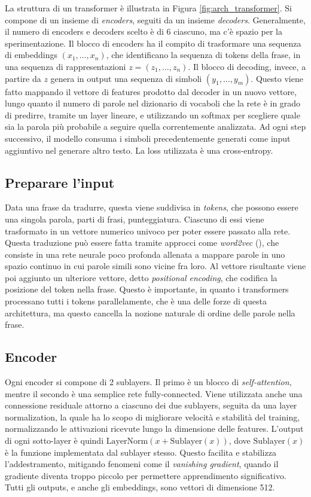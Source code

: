 La struttura di un transformer è illustrata in Figura \ref{fig:arch_transformer}. Si compone di un insieme di \textit{encoders}, seguiti da un insieme \textit{decoders}. Generalmente, il numero di encoders e decoders scelto è di 6 ciascuno, ma c'è spazio per la sperimentazione. Il blocco di encoders ha il compito di trasformare una sequenza di embeddings \((x_1, \dots, x_n)\), che identificano la sequenza di tokens della frase, in una sequenza di rappresentazioni \(z = (z_1, \dots, z_n)\). Il blocco di decoding, invece, a partire da \(z\) genera in output una sequenza di simboli \((y_1, \dots, y_m)\). Questo viene fatto mappando il vettore di features prodotto dal decoder in un nuovo vettore, lungo quanto il numero di parole nel dizionario di vocaboli che la rete è in grado di predirre, tramite un layer lineare, e utilizzando un softmax per scegliere quale sia la parola più probabile a seguire quella correntemente analizzata. Ad ogni step successivo, il modello consuma i simboli precedentemente generati come input aggiuntivo nel generare altro testo. La loss utilizzata è una cross-entropy.

\subsection{Preparare l'input}
Data una frase da tradurre, questa viene suddivisa in \textit{tokens}, che possono essere una singola parola, parti di frasi, punteggiatura. Ciascuno di essi viene trasformato in un vettore numerico univoco per poter essere passato alla rete. Questa traduzione può essere fatta tramite approcci come \textit{word2vec} (\cite{word2vec}), che consiste in una rete neurale poco profonda allenata a mappare parole in uno spazio continuo in cui parole simili sono vicine fra loro.
Al vettore risultante viene poi aggiunto un ulteriore vettore, detto \textit{positional encoding}, che codifica la posizione del token nella frase. Questo è importante, in quanto i transformers processano tutti i tokens parallelamente, che è una delle forze di questa architettura, ma questo cancella la nozione naturale di ordine delle parole nella frase.

\subsection{Encoder}
Ogni encoder si compone di 2 sublayers. Il primo è un blocco di \textit{self-attention}, mentre il secondo è una semplice rete fully-connected. Viene utilizzata anche una connessione residuale attorno a ciascuno dei due sublayers, seguita da una layer normalization, la quale ha lo scopo di migliorare velocità e stabilità del training, normalizzando le attivazioni ricevute lungo la dimensione delle features. L'output di ogni sotto-layer è quindi \(\text{LayerNorm}(x + \text{Sublayer}(x))\), dove \(\text{Sublayer}(x)\) è la funzione implementata dal sublayer stesso. Questo facilita e stabilizza l'addestramento, mitigando fenomeni come il \textit{vanishing gradient}, quando il gradiente diventa troppo piccolo per permettere apprendimento significativo. Tutti gli outputs, e anche gli embeddings, sono vettori di dimensione 512. 

